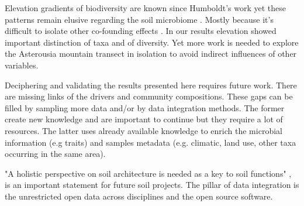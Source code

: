 Elevation gradients of biodiversity are known since Humboldt's work \parencite{Rahbek2019} 
yet these patterns remain elusive regarding the soil microbiome \parencite{Looby2020, Siles2023}.
Mostly because it's difficult to isolate other co-founding effects \parencite{Nottingham2018}.
In our results elevation showed important distinction of taxa and of diversity. Yet more work is 
needed to explore the Asterousia mountain transect in isolation to avoid indirect influences of 
other variables.

Deciphering and validating the results presented here requires future work.
There are missing links of the drivers and community compositions. These 
gaps can be filled by sampling more data and/or by data integration methods.
The former create new knowledge and are important to continue but they 
require a lot of resources. The latter uses already available knowledge 
to enrich the microbial information (e.g traits) and samples metadata
(e.g. climatic, land use, other taxa occurring in the same area).

"A holistic perspective on soil architecture is needed as a key to soil functions" \parencite{philippot2024the-interplay}, is 
an important statement for future soil projects.
The pillar of data integration is the unrestricted open data across disciplines and 
the open source software. 


